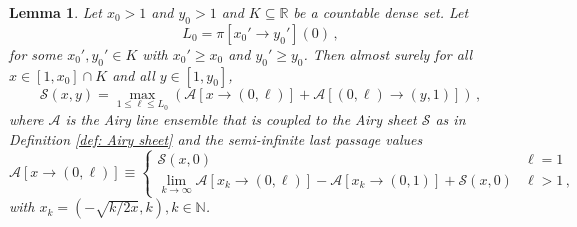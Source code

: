 \documentclass[11pt, reqno]{amsart}
\numberwithin{equation}{section}
\newcounter{dummy} \numberwithin{dummy}{section}
\newtheorem{lemma}[dummy]{Lemma}
\newcommand{\N}{\ensuremath{\mathbb{N}}}
\newcommand{\R}{\ensuremath{\mathbb{R}}}
\begin{document}
\begin{lemma}\label{lemma: Airy sheet variational formula}
Let $x_0>1$ and $y_0>1$ and $K\subseteq \R$ be a countable dense set. Let
\begin{equation*}L_0=\pi[x_0'\to y_0'](0)\,,\end{equation*}
for some $x_0',y_0'\in K$ with $x_0'\geq x_0$ and $y_0'\geq y_0$. Then almost surely for all $x\in [1,x_0]\cap K$ and all $y\in[1,y_0]$,
\begin{equation*}\mathcal{S}(x,y)=\max_{1\le \ell\le L_0}(\mathcal{A}[x\to(0,\ell)]+\mathcal{A}[(0,\ell)\to (y,1)])\,,\end{equation*}
where $\mathcal{A}$ is the Airy line ensemble that is coupled to the Airy sheet $\mathcal {S}$ as in Definition \ref{def: Airy sheet} and the semi-infinite last passage values
    \begin{equation}\label{eq: Airy limit}
    \mathcal{A}[x\to(0,\ell)]\equiv 
    \begin{cases}
        \mathcal{S}(x,0) & \ell = 1\\
        \displaystyle\lim_{k\to\infty}\mathcal{A}[x_k\to (0,\ell)]-\mathcal{A}[x_k\to (0,1)]+\mathcal{S}(x,0) & \ell >1\,,
    \end{cases}
    \end{equation}
   with $x_k = (-\sqrt{k/2x},k), k\in\N$. 
\end{lemma}
\end{document}
